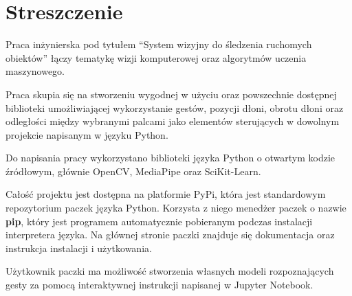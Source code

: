 \chapter{Streszczenie}



\quad Praca inżynierska pod tytułem \enquote{System wizyjny do śledzenia ruchomych obiektów} łączy tematykę wizji komputerowej oraz algorytmów uczenia maszynowego. 

\quad Praca skupia się na stworzeniu wygodnej w użyciu oraz powszechnie dostępnej biblioteki umożliwiającej wykorzystanie gestów, pozycji dłoni, obrotu dłoni oraz odległości między wybranymi palcami jako elementów sterujących w dowolnym projekcie napisanym w języku Python. 

\quad Do napisania pracy wykorzystano biblioteki języka Python o otwartym kodzie źródłowym, głównie OpenCV, MediaPipe oraz SciKit-Learn. 

\quad Całość projektu jest dostępna na platformie PyPi, która jest standardowym repozytorium paczek języka Python. Korzysta z niego menedżer paczek o nazwie \textbf{pip}, który jest programem automatycznie pobieranym podczas instalacji interpretera języka. Na głównej stronie paczki znajduje się dokumentacja oraz instrukcja instalacji i użytkowania. 

\quad Użytkownik paczki ma możliwość stworzenia własnych modeli rozpoznających gesty za pomocą interaktywnej instrukcji napisanej w Jupyter Notebook. 



\pagestyle{NumeryStronNazwyRozdzialow}